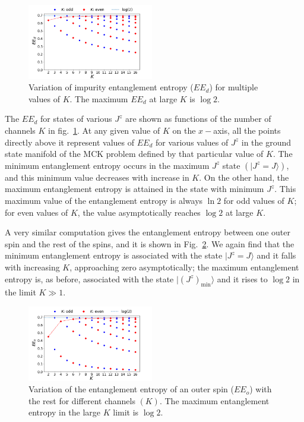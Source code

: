 \documentclass{iopart}
\begin{document}
\begin{figure}[!htpb]
\centering
\includegraphics[width=0.49\textwidth]{EEmultichannelANN.png}
\caption{Variation of impurity entanglement entropy ($EE_d$) for multiple values of \(K\). The maximum \(EE_d\) at large \(K\) is $\log 2$.}
\label{fig:EE_d}
\end{figure}
The \(EE_d\) for states of various \(J^z\) are shown as functions of the number of channels \(K\) in fig.~\ref{fig:EE_d}. At any given value of \(K\) on the \(x-\)axis, all the points directly above it represent values of \(EE_d\) for various values of \(J^z\) in the ground state manifold of the MCK problem defined by that particular value of \(K\). The minimum entanglement entropy occurs in the maximum \(J^z\) state $\left(|J^z=J\rangle\right)$, and this minimum value decreases with increase in \(K\). On the other hand, the maximum entanglement entropy is attained in the state with minimum \(J^z\). This maximum value of the entanglement entropy is always \(\ln 2\) for odd values of \(K\); for even values of \(K\), the value asymptotically reaches $\log 2$ at large \(K\). 

A very similar computation gives the entanglement entropy between one outer spin and the rest of the spins, and it is shown in Fig.~\ref{fig:EE_outer}.
We again find that the minimum entanglement entropy is associated with the state $|J^z=J\rangle$ and it falls with increasing \(K\), approaching zero asymptotically; the maximum entanglement entropy is, as before, associated with the state $|\left(J^z\right)_\mathrm{min}\rangle$ and it rises to $\log 2$ in the limit $K\gg 1$.
\begin{figure}[!htpb]
\centering
\includegraphics[width=0.49\textwidth]{outerEEmultichannelANN.png}
\caption{Variation of the entanglement entropy of an outer spin ($EE_o$) with the rest for different channels $(K)$. The maximum entanglement entropy in the large $K$ limit is $\log 2$.}
\label{fig:EE_outer}
\end{figure}
\end{document}
